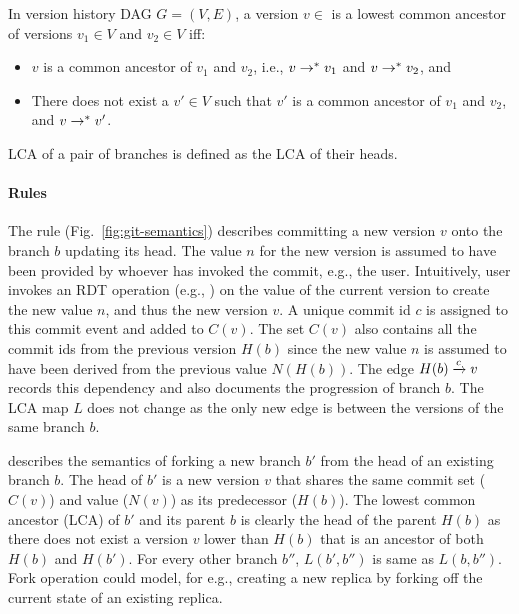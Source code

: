 \begin{definition}
  In version history DAG $G = (V,E)$, a version $v\in$ is a lowest common
  ancestor of versions $v_1 \in V$ and $v_2 \in V$ iff:
  \begin{itemize}
    \item $v$ is a common ancestor of $v_1$ and $v_2$, i.e., $v
      \rightarrow^{*} v_1$ and $v \rightarrow^{*} v_2$, and
    \item There does not exist a $v'\in V$ such that $v'$ is a common
      ancestor of $v_1$ and $v_2$, and $v \rightarrow^{*} v'$.
  \end{itemize}
  LCA of a pair of branches is defined as the LCA of their heads.
\end{definition}

\paragraph{Rules} The rule 
(Fig.~\ref{fig:git-semantics}) describes committing a new version $v$
onto the branch $b$ updating its head. The value $n$ for the new
version is assumed to have been provided by whoever has invoked the
commit, e.g., the user. Intuitively, user invokes an RDT operation
(e.g., ) on the value of the current version to create the
new value $n$, and thus the new version $v$. A unique commit id $c$ is
assigned to this commit event and added to $C(v)$. The set $C(v)$
also contains all the commit ids from the previous version $H(b)$
since the new value $n$ is assumed to have been derived from the
previous value $N(H(b))$. The edge $H(b) \xrightarrow{c} v$ records this
dependency and also documents the progression of branch $b$. The LCA
map $L$ does not change as the only new edge is between the versions
of the same branch $b$.

 describes the semantics of forking a new branch $b'$
from the head of an existing branch $b$. The head of $b'$ is a new
version $v$ that shares the same commit set ($C(v)$) and value
($N(v)$) as its predecessor ($H(b)$). The lowest common ancestor (LCA)
of $b'$ and its parent $b$ is clearly the head of the parent $H(b)$ as
there does not exist a version $v$ lower than $H(b)$ that is an
ancestor of both $H(b)$ and $H(b')$. For every other branch $b''$,
$L(b',b'')$ is same as $L(b,b'')$. Fork operation could model, for
e.g., creating a new replica by forking off the current state of an
existing replica.

